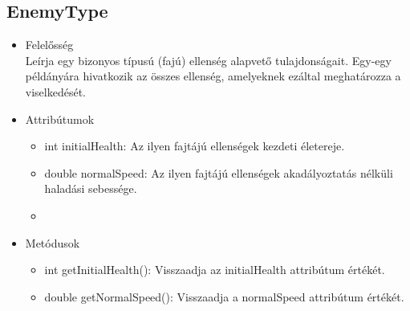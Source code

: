 \subsection{EnemyType}
\begin{itemize}
\item Felelősség\\
Leírja egy bizonyos típusú (fajú) ellenség alapvető tulajdonságait. Egy-egy példányára hivatkozik az összes ellenség, amelyeknek ezáltal meghatározza a viselkedését.

\item Attribútumok\\
	\begin{itemize}
		\item int initialHealth: Az ilyen fajtájú ellenségek kezdeti életereje.
		\item double normalSpeed: Az ilyen fajtájú ellenségek akadályoztatás nélküli haladási sebessége.
		\item {}
	\end{itemize}
\item Metódusok\\
	\begin{itemize}
		\item int getInitialHealth(): Visszaadja az initialHealth attribútum értékét.
		\item double getNormalSpeed(): Visszaadja a normalSpeed attribútum értékét.
	\end{itemize}
\end{itemize}

